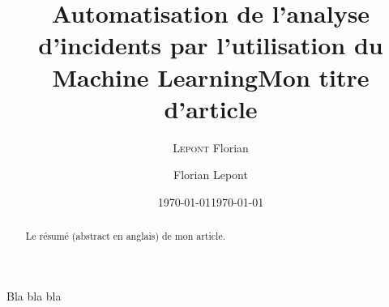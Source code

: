 \documentclass[a4paper,10pt]{report}
\title{Automatisation de l'analyse d'incidents par l'utilisation du Machine Learning}
\author{\textsc{Lepont} Florian}
\date{\today} %
\title{Mon titre d'article}
\date{\today}
\author{Florian Lepont}
\begin{document}
	
\maketitle

\begin{abstract}
Le résumé (abstract en anglais) de mon article.
\end{abstract}


\tableofcontents


Bla bla bla

\listoffigures
\listoftables
\printindex
\end{document}
